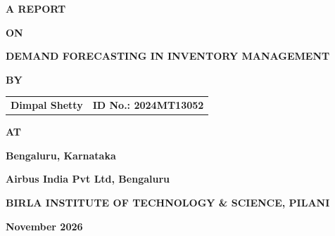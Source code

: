 \documentclass[12pt,oneside]{report}
\newcommand{\ReportTitle}{DEMAND FORECASTING IN INVENTORY MANAGEMENT}
\newcommand{\StudentName}{Dimpal Shetty}
\newcommand{\StudentID}{2024MT13052}
\newcommand{\OrgName}{Airbus India Pvt Ltd}
\newcommand{\OrgPlace}{Bengaluru}
\newcommand{\SubmitMonth}{November 2026}
\begin{document}
\begin{titlepage}
\centering\singlespacing
\vspace*{1.2in}
{\large\bfseries A REPORT\par}\vspace{0.6em}
{\large\bfseries ON\par}\vspace{0.6em}
{\Large\bfseries \ReportTitle\par}
\vspace{1.4in}
{\large\bfseries BY\par}\vspace{1.2em}
\begin{tabular*}{\textwidth}{@{\extracolsep{\fill}}ll}
\textbf{\StudentName} & \textbf{ID No.: \StudentID}
\end{tabular*}
\vspace{1.2in}

{\large\bfseries AT\par}\vspace{1em}
{\bfseries Bengaluru, Karnataka\par}\vspace{0.4em}
{\bfseries \OrgName, \OrgPlace\par}
\vfill
{\bfseries BIRLA INSTITUTE OF TECHNOLOGY \& SCIENCE, PILANI\par}\vspace{0.4em}
{\bfseries \SubmitMonth\par}
\end{titlepage}
\end{document}
